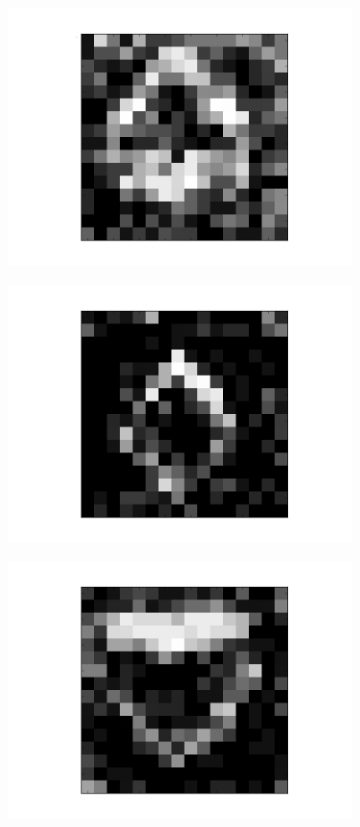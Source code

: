 \begin{figure}[h!]
	
	\begin{subfigure}{.25\textwidth}
  		\centering
  		\includegraphics[width=.8\linewidth]{imgs/poker/recon_img6.png}
  		\label{fig:sub1}
	\end{subfigure}%
	\begin{subfigure}{.25\textwidth}
  		\centering
  		\includegraphics[width=.8\linewidth]{imgs/poker/recon_img4.png}
  		\label{fig:sub1}
	\end{subfigure}%
	\begin{subfigure}{.25\textwidth}
  		\centering
  		\includegraphics[width=.8\linewidth]{imgs/poker/recon_img2.png}

\end{subfigure}
\end{figure}
